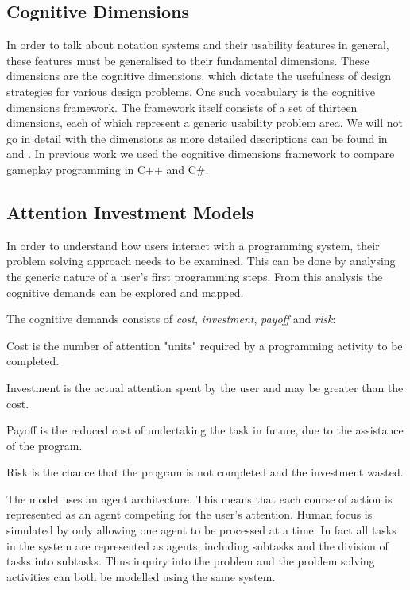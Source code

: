 \subsection{Cognitive Dimensions} \label{sec:cog-dim}
In order to talk about notation systems and their usability features in general, these features must be generalised to their fundamental dimensions. These dimensions are the cognitive dimensions, which dictate the usefulness of design strategies for various design problems. One such vocabulary is the cognitive dimensions framework\cite{green1996usability}. The framework itself consists of a set of thirteen dimensions, each of which represent a generic usability problem area. We will not go in detail with the dimensions as more detailed descriptions can be found in \cite{green1996usability} and \cite{p92018gameplay}. In previous work we used the cognitive dimensions framework to compare gameplay programming in C++ and C\#\cite{p92018gameplay}.

\subsection{Attention Investment Models} \label{sec:attention-investment}
In order to understand how users interact with a programming system, their problem solving approach needs to be examined. This can be done by analysing the generic nature of a user's first programming steps. From this analysis the cognitive demands can be explored and mapped\cite{blackwell2002first}.

The cognitive demands consists of \textit{cost}, \textit{investment}, \textit{payoff} and \textit{risk}:
\begin{labeling}{\quad\quad}
    \item[Cost] is the number of attention "units" required by a programming activity to be completed.
    \item[Investment] is the actual attention spent by the user and may be greater than the cost.
    \item[Payoff] is the reduced cost of undertaking the task in future, due to the assistance of the program.
    \item[Risk] is the chance that the program is not completed and the investment wasted.
\end{labeling}

The model uses an agent architecture. This means that each course of action is represented as an agent competing for the user's attention. Human focus is simulated by only allowing one agent to be processed at a time. In fact all tasks in the system are represented as agents, including subtasks and the division of tasks into subtasks. Thus inquiry into the problem and the problem solving activities can both be modelled using the same system.

